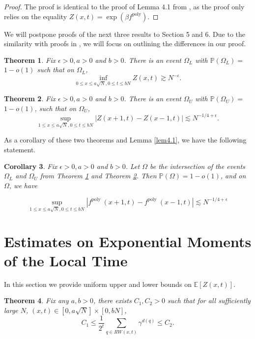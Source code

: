 \documentclass[10pt]{article}
\newtheorem{theorem}{Theorem}[section]
\newtheorem{corollary}[theorem]{Corollary}
\begin{document}
\begin{proof}
The proof is identical to the proof of Lemma 4.1 from \cite{adhikari2022invariance}, as the proof only relies on the equality $Z(x,t)=\exp(\beta f^{\text{poly}})$.
\end{proof}

We will postpone proofs of the next three results to Section 5 and 6. Due to the similarity with proofs in \cite{adhikari2022invariance}, we will focus on outlining the differences in our proof.

\begin{theorem} \label{3.2}
    Fix $\epsilon>0, a>0$ and $b>0$. There is an event $\Omega_{L}$ with $\mathbb{P}\left(\Omega_{L}\right)=$ $1-o(1)$ such that on $\Omega_{L}$,
$$
\inf _{0 \leq x \leq a\sqrt{N}, 0 \leq t \leq b N} Z(x, t) \gtrsim N^{-\epsilon} .
$$
\end{theorem}

\begin{theorem} \label{3.3}
    Fix $\epsilon>0, a>0$ and $b>0$. There is an event $\Omega_{U}$ with $\mathbb{P}\left(\Omega_{U}\right)=$ $1-o(1)$, such that on $\Omega_{U}$,
$$
\sup _{1 \leq x \leq a\sqrt{N}, 0 \leq t \leq b N}|Z(x+1, t)-Z(x-1, t)| \lesssim N^{-1 / 4+\epsilon} .
$$
\end{theorem}

As a corollary of these two theorems and Lemma \ref{lem4.1}, we have the following statement.

\begin{corollary}
    Fix $\epsilon>0, a>0$ and $b>0$. Let $\Omega$ be the intersection of the events $\Omega_{L}$ and $\Omega_{U}$ from Theorem \ref{3.2} and Theorem \ref{3.3}. Then $\mathbb{P}(\Omega)=1-o(1)$, and on $\Omega$, we have

$$
\sup _{1 \leq x \leq a\sqrt{N}, 0 \leq t \leq b N}\left|f^{\text {poly }}(x+1, t)-f^{\text {poly }}(x-1, t)\right| \lesssim N^{-1 / 4+\epsilon}
$$
\end{corollary}


\section{Estimates on Exponential Moments of the Local Time} \label{sec4}
In this section we provide  uniform upper and lower bounds on $\mathbb{E}[{Z(x,t)}]$.


\begin{theorem} \label{5.1}
    Fix any $a, b >0$, there exists $C_1, C_2 >0$ such that for all sufficiently large $N$,  $(x,t) \in [0,a\sqrt{N}] \times [0,bN]$, 
    $$C_1 \leq \frac{1}{2^t} \sum_{q \in RW(x,t)} \gamma^{d(q)} \leq C_2.$$
\end{theorem}
\end{document}
